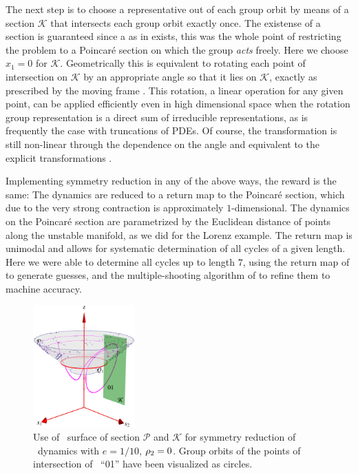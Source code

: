 The next step is to choose a representative out of each group orbit by means of a section $\mathcal{K}$ that intersects each group orbit
exactly once. The existense of a section is guaranteed since a {\csection} as in  exists,
this was the whole point of restricting the problem to a Poincar\'e section
on which the group \emph{acts} freely. Here we choose $x_1=0$ for $\mathcal{K}$. Geometrically
this is equivalent to rotating each point of intersection on $\mathcal{K}$ by
an appropriate angle so that it lies on $\mathcal{K}$, exactly as prescribed by
the moving frame . This rotation, a linear operation for any given point,
can be applied efficiently even in high dimensional space when the rotation group representation is a direct
sum of irreducible representations, as is frequently the case with truncations of PDEs.
Of course, the transformation is still non-linear through the dependence on the angle and equivalent
to the explicit transformations .

Implementing symmetry reduction in any of the above ways, the reward is the same: The
dynamics are reduced to a return map to the Poincar\'e section, which due to
the very strong contraction is approximately $1$-dimensional. The dynamics on the Poincar\'e
section are parametrized by the Euclidean distance of points along the unstable manifold, as we did
for the Lorenz example.
The return map is unimodal and allows for systematic determination of all cycles of
a given length. Here we were able to determine all cycles up to length $7$, using
the return map of  to generate guesses, and the multiple-shooting
algorithm of  to refine them to machine accuracy.

\begin{figure}[ht]
\begin{center}
  \includegraphics[width=0.35\textwidth]{../figs/CLEmartini}
\end{center}
\caption[\CLe\ desymmetrization with double section]{Use of \Poincare\
surface of section $\mathcal{P}$ and {\csection} $\mathcal{K}$ for symmetry
reduction of \CLe\ dynamics with $e=1/10$, $\rho_2=0$.
Group orbits of the points of intersection of \rpo\ ``01'' have been visualized as circles.
    }
\label{fig:CLEmartini}
\end{figure}


